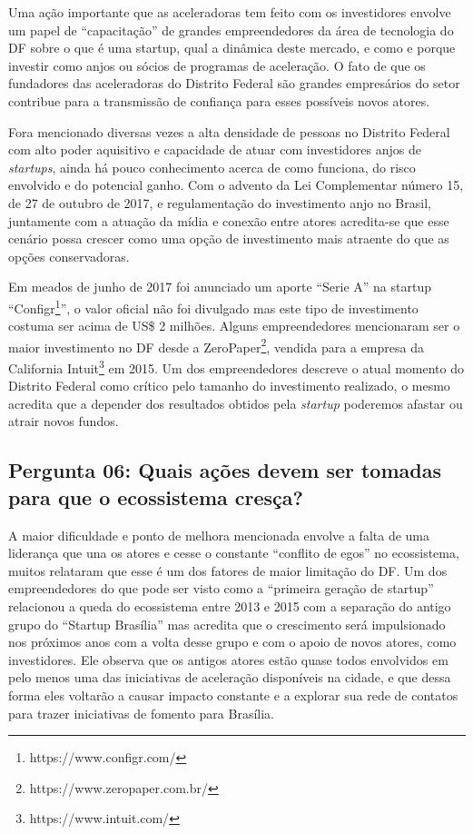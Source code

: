 Uma ação importante que as aceleradoras tem feito com os investidores envolve um papel de ``capacitação'' de grandes empreendedores da área de tecnologia do DF sobre o que é uma startup, qual a dinâmica deste mercado, e como e porque investir como anjos ou sócios de programas de aceleração. O fato de que os fundadores das aceleradoras do Distrito Federal são grandes empresários do setor contribue para a transmissão de confiança para esses possíveis novos atores. 

Fora mencionado diversas vezes a alta densidade de pessoas no Distrito Federal com alto poder aquisitivo e capacidade de atuar com investidores anjos de \textit{startups}, ainda há pouco conhecimento acerca de como funciona, do risco envolvido e do potencial ganho. Com o advento da Lei Complementar número 15, de 27 de outubro de 2017, e regulamentação do investimento anjo no Brasil, juntamente com a atuação da mídia e conexão entre atores acredita-se que esse cenário possa crescer como uma opção de investimento mais atraente do que as opções conservadoras.

Em meados de junho de 2017 foi anunciado um aporte ``Serie A'' na startup ``Configr\footnote{https://www.configr.com/}'', o valor oficial não foi divulgado mas este tipo de investimento costuma ser acima de US\$ 2 milhões. Alguns empreendedores mencionaram ser o maior investimento no DF desde a ZeroPaper\footnote{https://www.zeropaper.com.br/}, vendida para a empresa da California Intuit\footnote{https://www.intuit.com/} em 2015. Um dos empreendedores descreve o atual momento do Distrito Federal como crítico pelo tamanho do investimento realizado, o mesmo acredita que a depender dos resultados obtidos pela \textit{startup} poderemos afastar ou atrair novos fundos.

\subsection*{Pergunta 06: Quais ações devem ser tomadas para que o ecossistema cresça?}
\label{subsection:pergunta_de_pesquisa_6}

A maior dificuldade e ponto de melhora mencionada envolve a falta de uma liderança que una os atores e cesse o constante ``conflito de egos'' no ecossistema, muitos relataram que esse é um dos fatores de maior limitação do DF. Um dos empreendedores do que pode ser visto como a ``primeira geração de startup'' relacionou a queda do ecossistema entre 2013 e 2015 com a separação do antigo grupo do ``Startup Brasília'' mas acredita que o crescimento será impulsionado nos próximos anos com a volta desse grupo e com o apoio de novos atores, como investidores. Ele observa que os antigos atores estão quase todos envolvidos em pelo menos uma das iniciativas de aceleração disponíveis na cidade, e que dessa forma eles voltarão a causar impacto constante e a explorar sua rede de contatos para trazer iniciativas de fomento para Brasília.  

